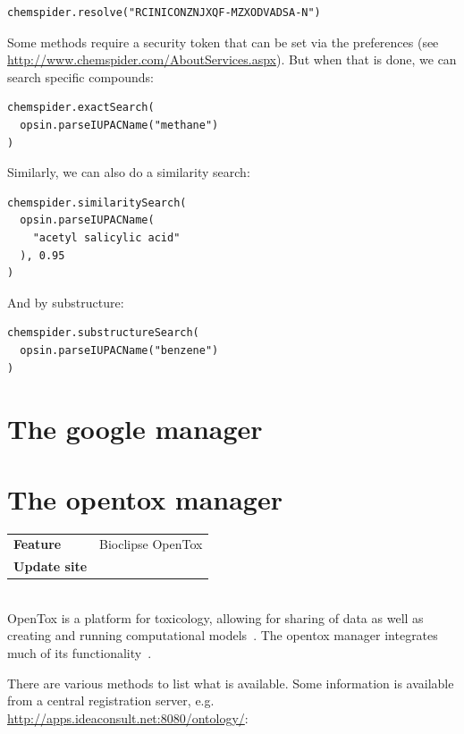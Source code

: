 \documentclass[a5paper, 10pt]{memoir}
\renewcommand{\todo}[1]{{\color{white}\oldtodo{\textsf{#1}}}}
\begin{document}
\begin{refsection}
\begin{Verbatim}
chemspider.resolve("RCINICONZNJXQF-MZXODVADSA-N")
\end{Verbatim}
Some methods require a security token that can be set via the preferences (see
\url{http://www.chemspider.com/AboutServices.aspx}). But when that is done, we
can search specific compounds:

\begin{Verbatim}
chemspider.exactSearch(
  opsin.parseIUPACName("methane")
)
\end{Verbatim}
Similarly, we can also do a similarity search:

\begin{Verbatim}
chemspider.similaritySearch(
  opsin.parseIUPACName(
    "acetyl salicylic acid"
  ), 0.95
)
\end{Verbatim}
And by substructure:

\begin{Verbatim}
chemspider.substructureSearch(
  opsin.parseIUPACName("benzene")
)
\end{Verbatim}

\section{The google manager}
\todo{Egon should write this}

\section{The opentox manager}

\begin{tabular}{ll}
\textbf{Feature} & Bioclipse OpenTox \\
\textbf{Update site} & \url{} \\
\end{tabular} \\

\noindent
OpenTox is a platform for toxicology, allowing for sharing of
data as well as creating and running computational
models~\cite{hardy2010collaborative}. The opentox manager integrates much of its
functionality~\cite{willighagen2011computational}.

There are various methods to list what is available. Some information is
available from a central registration server, e.g.
\url{http://apps.ideaconsult.net:8080/ontology/}:


\end{refsection}
\end{document}
